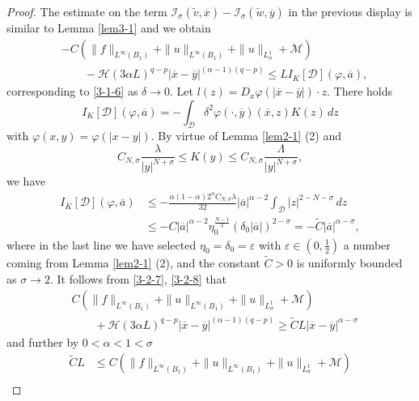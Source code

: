 \documentclass[11pt,reqno]{amsart}
\numberwithin{equation}{section}
\begin{document}
\begin{proof}
The estimate on the term $\mathcal{I}_\sigma(\widetilde{v},\overline{x})-\mathcal{I}_\sigma(\widetilde{w},\overline{y})$ in the previous display is similar to Lemma \ref{lem3-1}
and we obtain
\begin{equation}
\label{3-2-7}
\begin{split}
&-C(\|f\|_{L^\infty(B_1)}+\|u\|_{L^\infty(B_1)}+\|u\|_{L^1_\sigma}+\mathcal{M})\\
&\qquad-\mathcal{H}(3\alpha L)^{q-p}|\overline{x}-\overline{y}|^{(\alpha-1)(q-p)}\le LI_K[\mathcal{D}](\varphi,\overline{a}),
\end{split}
\end{equation}
corresponding to \eqref{3-1-6} as $\delta\rightarrow0$.
Let $l(z)=D_x\varphi(|\overline{x}-\overline{y}|)\cdot z$. There holds
$$
I_K[\mathcal{D}](\varphi,\overline{a})=-\int_{\mathcal{D}}\delta^2\varphi(\cdot,\overline{y})(\overline{x},z)K(z)\,dz
$$
with $\varphi(x,y)=\varphi(|x-y|)$. By virtue of Lemma \ref{lem2-1} (2) and
$$
C_{N,\sigma}\frac{\lambda}{|y|^{N+\sigma}}\le K(y)\le C_{N,\sigma}\frac{\Lambda}{|y|^{N+\sigma}},
$$
we have
\begin{equation}
\label{3-2-8}
\begin{split}
I_K[\mathcal{D}](\varphi,\overline{a})&\le-\frac{\alpha(1-\alpha)2^\alpha C_{N,\sigma}\lambda}{32}|\overline{a}|^{\alpha-2}\int_{\mathcal{D}}
|z|^{2-N-\sigma}\,dz \\
&\le-C|\overline{a}|^{\alpha-2}\eta_0^{\frac{N-1}{2}}(\delta_0|\overline{a}|)^{2-\sigma}
=-\widetilde{C}|\overline{a}|^{\alpha-\sigma},
\end{split}
\end{equation}
where in the last line we have selected $\eta_0=\delta_0=\varepsilon$ with $\varepsilon\in(0,\frac{1}{2})$ a number coming from Lemma \ref{lem2-1} (2), and the constant $\widetilde{C}>0$ is uniformly bounded as $\sigma\rightarrow2$. It follows from \eqref{3-2-7}, \eqref{3-2-8} that
\[
\begin{split}
&C(\|f\|_{L^\infty(B_1)}+\|u\|_{L^\infty(B_1)}+\|u\|_{L^1_\sigma}+\mathcal{M})\\
&\qquad+\mathcal{H}(3\alpha L)^{q-p}|\overline{x}-\overline{y}|^{(\alpha-1)(q-p)}\ge\widetilde{C}L|\overline{x}-\overline{y}|^{\alpha-\sigma}
\end{split}
\]
and further by $0<\alpha<1<\sigma$
\begin{equation}
\label{3-2-9}
\begin{split}
\widetilde{C}L&\le C(\|f\|_{L^\infty(B_1)}+\|u\|_{L^\infty(B_1)}+\|u\|_{L^1_\sigma}+\mathcal{M})\\

\end{split}
\end{equation}
\end{proof}
\end{document}
